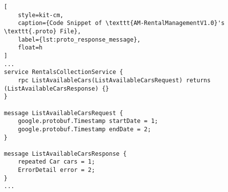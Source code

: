 \begin{lstlisting}[
    style=kit-cm,
    caption={Code Snippet of \texttt{AM-RentalManagementV1.0}'s \texttt{.proto} File},
    label={lst:proto_response_message},
    float=h
]
...
service RentalsCollectionService {
    rpc ListAvailableCars(ListAvailableCarsRequest) returns (ListAvailableCarsResponse) {}
}

message ListAvailableCarsRequest {  
    google.protobuf.Timestamp startDate = 1;
    google.protobuf.Timestamp endDate = 2;
}

message ListAvailableCarsResponse {
    repeated Car cars = 1;
    ErrorDetail error = 2;
}
...
\end{lstlisting}
